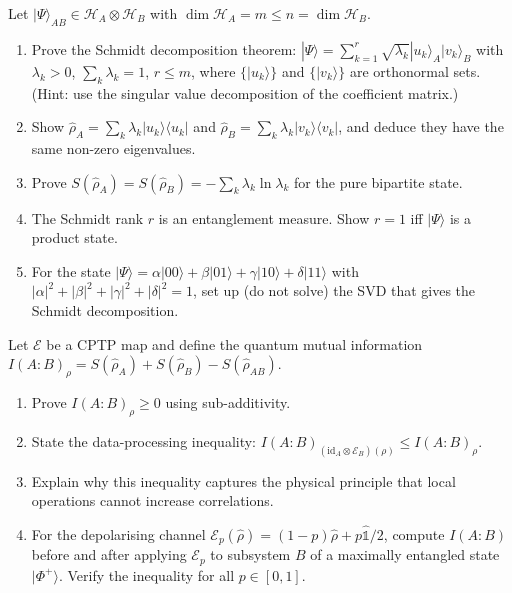 \documentclass[11pt,a4paper]{article}
\begin{document}
\begin{tcolorbox}[gradprobbox, title={Problem 2 --- Schmidt Decomposition and Entanglement (T4)}]
Let $|\Psi\rangle_{AB}\in\mathcal{H}_A\otimes\mathcal{H}_B$ with
$\dim\mathcal{H}_A=m\le n=\dim\mathcal{H}_B$.

\begin{enumerate}[label=(\alph*), itemsep=8pt]
  \item Prove the Schmidt decomposition theorem:
        $|\Psi\rangle=\sum_{k=1}^r\sqrt{\lambda_k}|u_k\rangle_A|v_k\rangle_B$
        with $\lambda_k>0$, $\sum_k\lambda_k=1$, $r\le m$,
        where $\{|u_k\rangle\}$ and $\{|v_k\rangle\}$ are orthonormal sets.
        (Hint: use the singular value decomposition of the coefficient matrix.)
  \item Show $\hat{\rho}_A=\sum_k\lambda_k|u_k\rangle\langle u_k|$ and
        $\hat{\rho}_B=\sum_k\lambda_k|v_k\rangle\langle v_k|$,
        and deduce they have the same non-zero eigenvalues.
  \item Prove $S(\hat{\rho}_A)=S(\hat{\rho}_B)=-\sum_k\lambda_k\ln\lambda_k$
        for the pure bipartite state.
  \item The Schmidt rank $r$ is an entanglement measure.
        Show $r=1$ iff $|\Psi\rangle$ is a product state.
  \item For the state
        $|\Psi\rangle=\alpha|00\rangle+\beta|01\rangle+\gamma|10\rangle+\delta|11\rangle$
        with $|\alpha|^2+|\beta|^2+|\gamma|^2+|\delta|^2=1$,
        set up (do not solve) the SVD that gives the Schmidt decomposition.
\end{enumerate}
\end{tcolorbox}

\bigskip

\begin{tcolorbox}[gradprobbox, title={Problem 3 --- Data-Processing Inequality (T4)}]
Let $\mathcal{E}$ be a CPTP map and define the quantum mutual information
$I(A:B)_\rho=S(\hat{\rho}_A)+S(\hat{\rho}_B)-S(\hat{\rho}_{AB})$.

\begin{enumerate}[label=(\alph*), itemsep=8pt]
  \item Prove $I(A:B)_\rho\ge 0$ using sub-additivity.
  \item State the data-processing inequality:
        $I(A:B)_{(\mathrm{id}_A\otimes\mathcal{E}_B)(\rho)}\le I(A:B)_\rho$.
  \item Explain why this inequality captures the physical principle that
        local operations cannot increase correlations.
  \item For the depolarising channel
        $\mathcal{E}_p(\hat{\rho})=(1-p)\hat{\rho}+p\hat{\mathbb{1}}/2$,
        compute $I(A:B)$ before and after applying $\mathcal{E}_p$ to subsystem
        $B$ of a maximally entangled state $|\Phi^+\rangle$.
        Verify the inequality for all $p\in[0,1]$.
\end{enumerate}
\end{tcolorbox}
\end{document}
